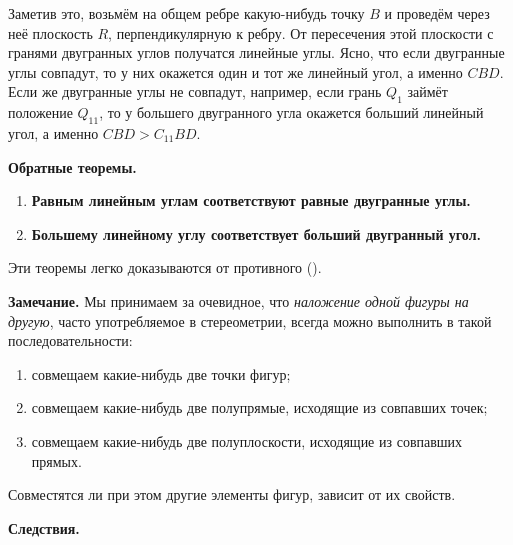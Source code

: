 Заметив это, возьмём на общем ребре какую-нибудь точку \(B\) и проведём через неё плоскость \(R\), перпендикулярную к ребру. От пересечения этой плоскости с гранями двугранных углов получатся линейные углы. Ясно, что если двугранные углы совпадут, то у них окажется один и тот же линейный угол, а именно \(CBD\). Если же двугранные углы не совпадут, например, если грань \(Q_1\) займёт положение \(Q_{11}\), то у большего двугранного угла окажется больший линейный угол, а именно \(CBD>C_{11}BD\).

 \textbf{Обратные теоремы.}

\begin{enumerate}[label=\arabic*),ref=\arabic*]
    \item \textbf{Равным линейным углам соответствуют равные двугранные углы.}
    \item \textbf{Большему линейному углу соответствует больший двугранный угол.}
\end{enumerate}

Эти теоремы легко доказываются от противного ().

 \textbf{Замечание.} Мы принимаем за очевидное, что \emph{наложение одной фигуры на другую}, часто употребляемое в стереометрии, всегда можно выполнить в такой последовательности:

\begin{enumerate}[label=\arabic*),ref=\arabic*]
    \item совмещаем какие-нибудь две точки фигур;
    \item совмещаем какие-нибудь две полупрямые, исходящие из совпавших точек;
    \item совмещаем какие-нибудь две полуплоскости, исходящие из совпавших прямых.
\end{enumerate}

Совместятся ли при этом другие элементы фигур, зависит от их свойств.

 \textbf{Следствия.}


